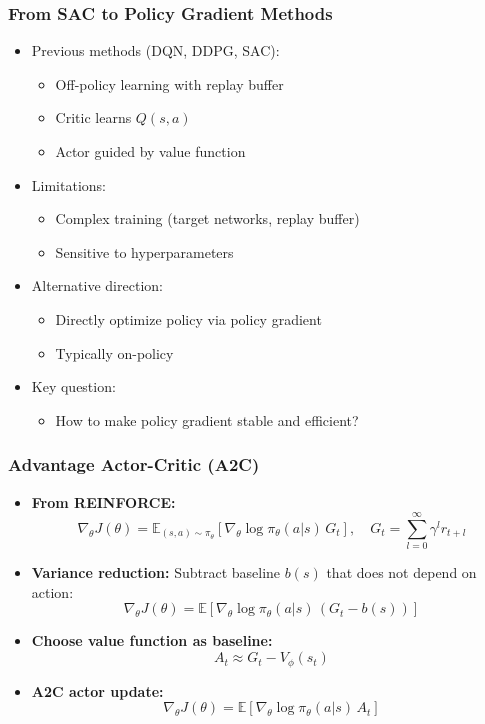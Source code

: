 \documentclass[11pt,aspectratio=169,xcolor={dvipsnames},usepdftitle=false]{beamer}
\begin{document}
\begin{frame}
\frametitle{From SAC to Policy Gradient Methods}
\begin{itemize}
	\item Previous methods (DQN, DDPG, SAC):
	\begin{itemize}
		\item Off-policy learning with replay buffer
		\item Critic learns $Q(s,a)$
		\item Actor guided by value function
	\end{itemize}

	\item Limitations:
	\begin{itemize}
		\item Complex training (target networks, replay buffer)
		\item Sensitive to hyperparameters
	\end{itemize}

	\item Alternative direction:
	\begin{itemize}
		\item Directly optimize policy via policy gradient
		\item Typically on-policy
	\end{itemize}

	\item Key question:
	\begin{itemize}
		\item How to make policy gradient stable and efficient?
	\end{itemize}

\end{itemize}
\end{frame}


\begin{frame}
\frametitle{Advantage Actor-Critic (A2C)}
\begin{itemize}

	\item \textbf{From REINFORCE:}
	\vspace{-1.0em}
    $$
	\nabla_\theta J(\theta)
	=
	\mathbb{E}_{(s,a)\sim\pi_\theta}\left[
	\nabla_\theta\log\pi_\theta(a|s)\,G_t
	\right], \quad
	G_t = \sum_{l=0}^\infty \gamma^l r_{t+l}
	$$

	\item \textbf{Variance reduction:}
	Subtract baseline $b(s)$ that does not depend on action:
    $$
	\nabla_\theta J(\theta)
	=
	\mathbb{E}\left[
	\nabla_\theta\log\pi_\theta(a|s)\,(G_t-b(s))
	\right]
	$$

	\item \textbf{Choose value function as baseline:}
	\vspace{-1.0em}
    $$
	A_t \approx G_t - V_\phi(s_t)
	$$

	\item \textbf{A2C actor update:}
	$$
	\nabla_\theta J(\theta)
	=
	\mathbb{E}\left[
	\nabla_\theta\log\pi_\theta(a|s)\,A_t
	\right]
	$$

\end{itemize}
\end{frame}
\end{document}
